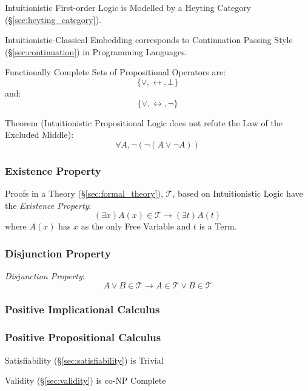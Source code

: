 Intuitionistic First-order Logic is Modelled by a Heyting Category
(\S\ref{sec:heyting_category}).

Intuitionistic-Classical Embedding corresponds to Continuation Passing
Style (\S\ref{sec:continuation}) in Programming Languages.

Functionally Complete Sets of Propositional Operators are:
\[
  \{ \vee, \leftrightarrow, \bot \}
\]
and:
\[
  \{ \vee, \leftrightarrow, \neg \}
\]

Theorem (Intuitionistic Propositional Logic does not refute the Law of
the Excluded Middle)\cite{harper12}:
\[
  \forall A, \neg (\neg (A \vee \neg A))
\]



\subsubsection{Existence Property}\label{sec:existence_property}

Proofs in a Theory (\S\ref{sec:formal_theory}), $\mathcal{T}$, based
on Intuitionistic Logic have the \emph{Existence Property}:
\[
  (\exists x)A(x) \in \mathcal{T} \rightarrow (\exists t)A(t)
\]
where $A(x)$ has $x$ as the only Free Variable and $t$ is a Term.



\subsubsection{Disjunction Property}\label{sec:disjunction_property}

\emph{Disjunction Property}:
\[
  A \vee B \in \mathcal{T}
  \rightarrow A \in \mathcal{T} \vee B \in \mathcal{T}
\]



\subsubsection{Positive Implicational Calculus}
\label{sec:positive_implicational}



\subsubsection{Positive Propositional Calculus}
\label{sec:positive_propositional}

Satisfiability (\S\ref{sec:satisfiability}) is Trivial

Validity (\S\ref{sec:validity}) is co-NP Complete %



